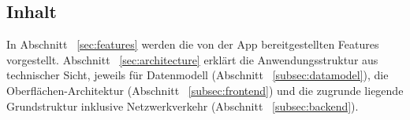 \subsection{Inhalt}\label{subsec:inhalt}

In Abschnitt ~\ref{sec:features} werden die von der App bereitgestellten Features vorgestellt.
Abschnitt ~\ref{sec:architecture} erklärt die Anwendungsstruktur aus technischer Sicht, jeweils für Datenmodell (Abschnitt ~\ref{subsec:datamodel}), die Oberflächen-Architektur (Abschnitt ~\ref{subsec:frontend}) und die zugrunde liegende Grundstruktur inklusive Netzwerkverkehr (Abschnitt ~\ref{subsec:backend}).

